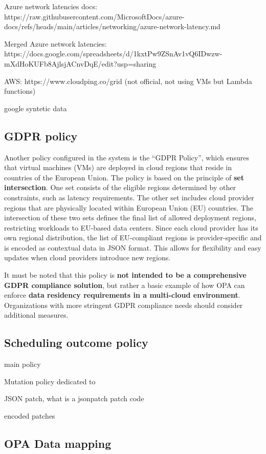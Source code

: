 Azure network latencies docs:
https://raw.githubusercontent.com/MicrosoftDocs/azure-docs/refs/heads/main/articles/networking/azure-network-latency.md

Merged Azure network latencies:
https://docs.google.com/spreadsheets/d/1kxtPw9ZSnAv1vQ6IDwzw-mXdHoKUFb8AjlsjACnvDqE/edit?usp=sharing 


AWS:
https://www.cloudping.co/grid (not official, not using VMs but Lambda functions)

google
syntetic data



\subsection{GDPR policy}

Another policy configured in the system is the ``GDPR Policy'', which ensures that virtual machines (VMs) are deployed in cloud regions that reside in countries of the European Union. 
The policy is based on the principle of \textbf{set intersection}. One set consists of the eligible regions determined by other constraints, such as latency requirements. The other set includes cloud provider regions that are physically located within European Union (EU) countries.
The intersection of these two sets defines the final list of allowed deployment regions, restricting workloads to EU-based data centers.
Since each cloud provider has its own regional distribution, the list of EU-compliant regions is provider-specific and is encoded as contextual data in JSON format. This allows for flexibility and easy updates when cloud providers introduce new regions.

It must be noted that this policy is \textbf{not intended to be a comprehensive GDPR compliance solution}, but rather a basic example of how OPA can enforce \textbf{data residency requirements in a multi-cloud environment}. Organizations with more stringent GDPR compliance needs should consider additional measures.

\subsection{Scheduling outcome policy}

main policy

Mutation policy
dedicated to 


JSON patch, what is a jsonpatch
patch code

encoded patches

\subsection{OPA Data mapping}

